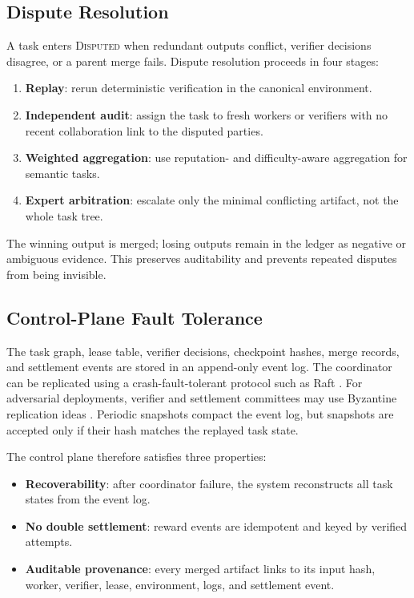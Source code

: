 \documentclass{article}
\theoremstyle{plain}
\begin{document}
\subsection{Dispute Resolution}

A task enters \textsc{Disputed} when redundant outputs conflict, verifier decisions disagree, or a parent merge fails. Dispute resolution proceeds in four stages:
\begin{enumerate}
\item \textbf{Replay}: rerun deterministic verification in the canonical environment.
\item \textbf{Independent audit}: assign the task to fresh workers or verifiers with no recent collaboration link to the disputed parties.
\item \textbf{Weighted aggregation}: use reputation- and difficulty-aware aggregation for semantic tasks.
\item \textbf{Expert arbitration}: escalate only the minimal conflicting artifact, not the whole task tree.
\end{enumerate}
The winning output is merged; losing outputs remain in the ledger as negative or ambiguous evidence. This preserves auditability and prevents repeated disputes from being invisible.

\subsection{Control-Plane Fault Tolerance}

The task graph, lease table, verifier decisions, checkpoint hashes, merge records, and settlement events are stored in an append-only event log. The coordinator can be replicated using a crash-fault-tolerant protocol such as Raft \citep{ongaro2014raft}. For adversarial deployments, verifier and settlement committees may use Byzantine replication ideas \citep{castro1999pbft}. Periodic snapshots compact the event log, but snapshots are accepted only if their hash matches the replayed task state.

The control plane therefore satisfies three properties:
\begin{itemize}
\item \textbf{Recoverability}: after coordinator failure, the system reconstructs all task states from the event log.
\item \textbf{No double settlement}: reward events are idempotent and keyed by verified attempts.
\item \textbf{Auditable provenance}: every merged artifact links to its input hash, worker, verifier, lease, environment, logs, and settlement event.
\end{itemize}
\end{document}
